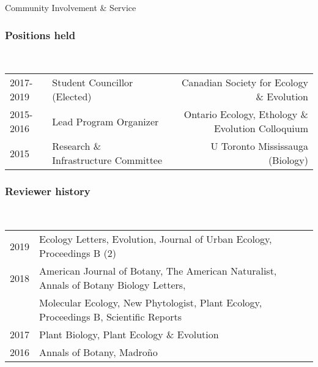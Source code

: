 \documentclass[11pt]{article}
\begin{document}
\noindent \begin{rSection}{Community Involvement \& Service}
\noindent

\subsubsection*{Positions held}\\
\begin{tabular}{llr}
2017-2019 & Student Councillor (Elected) & Canadian Society for Ecology \& Evolution\\
2015-2016 & Lead Program Organizer & Ontario Ecology, Ethology \& Evolution Colloquium\\
2015 & Research \& Infrastructure Committee & U Toronto Mississauga (Biology)\\
\end{tabular}
\vspace{0.5em}

\subsubsection*{Reviewer history}\\
\begin{tabular}{llr}

2019 & Ecology Letters, Evolution, Journal of Urban Ecology, Proceedings B (2)\\

2018 & American Journal of Botany, The American Naturalist, Annals of Botany Biology Letters,\\
&  Molecular Ecology, New Phytologist, Plant Ecology, Proceedings B, Scientific Reports\\

2017 & Plant Biology, Plant Ecology \& Evolution\\

2016 & Annals of Botany, Madro{\~n}o

\end{tabular}
\end{rSection}
\end{document}
